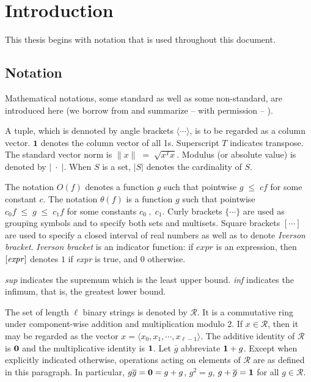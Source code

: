 \chapter{Introduction} \label{ch:introduction}
This thesis begins with notation that is used throughout this document.
\section{Notation}
Mathematical notations, some standard as well as some non-standard, are introduced here 
(we borrow from and summarize -- with permission -- \cite{Vose1999}).

A tuple, which is dennoted by angle brackets $\langle \cdots \rangle$, is to be regarded as a column
vector. $\bm{1}$ denotes the column vector of all 1s. Superscript $T$ indicates transpose. 
The standard vector norm is $\|x\| \;=\; \sqrt{x^T x}$. Modulus (or absolute value) is denoted by $|\; \cdot \;|$. 
When $S$ is a set, $|S|$ denotes the cardinality of $S$.

The notation $O(f)$ denotes a function $g$ such that pointwise $g \;\leq \;c f$ for some constant $c$. 
The notation $\theta(f)$ is a function $g$ such that pointwise 
$c_0 f \;\leq\; g \;\leq\; c_1 f$ for some constants $c_0 \;,\; c_1$. 
Curly brackets $\{\cdots\}$ are used as grouping symbols and to specify both sets
and multisets. Square brackets $[ \cdots ]$ are used to specify 
a closed interval of real numbers as well as to denote {\em Iverson bracket}. 
{\em Iverson bracket} is an indicator function:
if $expr$ is an expression, then
$[\mbox{\em expr\/} ]$ denotes $1$ if {\em expr\/} is
true, and $0$ otherwise. 

{\em sup \/} indicates the supremum which is the least upper bound. {\em inf \/} indicates the infimum, 
that is, the greatest lower bound.

The set of length $\ell$ binary strings is denoted by $\mathcal{R}$. It is a
commutative ring under component-wise addition and
multiplication modulo $2$. If $x \in \mathcal{R}$, then it may 
be regarded as the vector $x = \langle x_0, x_1, \cdots, x_{\ell - 1} \rangle$. 
The additive identity of $\mathcal{R}$ is ${\bf 0}$ and the
multiplicative identity is ${\bf 1}$. Let $\overline{g}$
abbreviate ${\bf 1} + g$.  Except when explicitly indicated otherwise,
operations acting on elements of $\mathcal{R}$ are as defined in this
paragraph. In particular, $g \overline{g} = {\bf 0} = g+g$,
  $g^2 = g$, $g + \overline{g} = {\bf 1}$ for all $g \in
  \mathcal{R}$.


